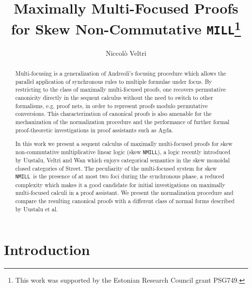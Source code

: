 \documentclass[runningheads]{llncs}
\newcommand{\MILL}{\texttt{MILL}}
\newcommand{\NMILL}{\texttt{NMILL}}
\begin{document}
\title{Maximally Multi-Focused Proofs for Skew Non-Commutative \MILL\thanks{This work was supported by the Estonian Research Council grant PSG749.}}

\author{Niccol{\`o} Veltri}
%
%
\maketitle
%
\begin{abstract}

  Multi-focusing is a generalization of Andreoli's focusing procedure which allows the parallel application of synchronous rules to multiple formulae under focus. By restricting to the class of maximally multi-focused proofs, one recovers permutative canonicity directly in the sequent calculus without the need to switch to other formalisms, e.g. proof nets, in order to  represent proofs modulo permutative conversions. This characterization of canonical proofs is also amenable for the mechanization of the normalization procedure and the performance of further formal proof-theoretic investigations in proof assistants such as Agda.

  In this work we present a sequent calculus of maximally multi-focused proofs for skew non-commutative multiplicative linear logic (skew \NMILL), a logic recently introduced by Uustalu, Veltri and Wan which enjoys categorical semantics in the skew monoidal closed categories of Street. The peculiarity of the multi-focused system for skew \NMILL\ is the presence of at most two foci during the synchronous phase, a reduced complexity which makes it a good candidate for initial investigations on maximally multi-focused calculi in a proof assistant. We present the normalization procedure and compare the resulting canonical proofs with a different class of normal forms described by Uustalu et al.
  
\end{abstract}

\section{Introduction}\label{sec:intro}
\end{document}

